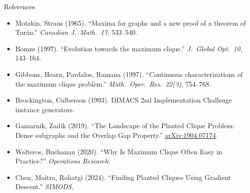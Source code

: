 \documentclass[aspectratio=169]{beamer}
\begin{document}

\begin{frame}{References}
    \footnotesize
    \begin{itemize}
        \item Motzkin, Straus (1965). ``Maxima for graphs and a new proof of a theorem of Turán.'' \emph{Canadian J.\ Math.\ 17}, 533--540.
        \item Bomze (1997). ``Evolution towards the maximum clique.'' \emph{J.\ Global Opt.\ 10}, 143--164.
        \item Gibbons, Hearn, Pardalos, Ramana (1997). ``Continuous characterizations of the maximum clique problem.'' \emph{Math.\ Oper.\ Res.\ 22(3)}, 754--768.
        \item Brockington, Culberson (1993). DIMACS 2nd Implementation Challenge instance generators.
        \item Gamarnik, Zadik (2019). ``The Landscape of the Planted Clique Problem: Dense subgraphs and the Overlap Gap Property.'' \href{https://arxiv.org/abs/1904.07174}{arXiv:1904.07174}.
        \item Walteros, Buchanan (2020). ``Why Is Maximum Clique Often Easy in Practice?'' \emph{Operations Research}.
        \item Chen, Moitra, Rohatgi (2024). ``Finding Planted Cliques Using Gradient Descent.'' \emph{SIMODS}.
    \end{itemize}
\end{frame}
\end{document}
